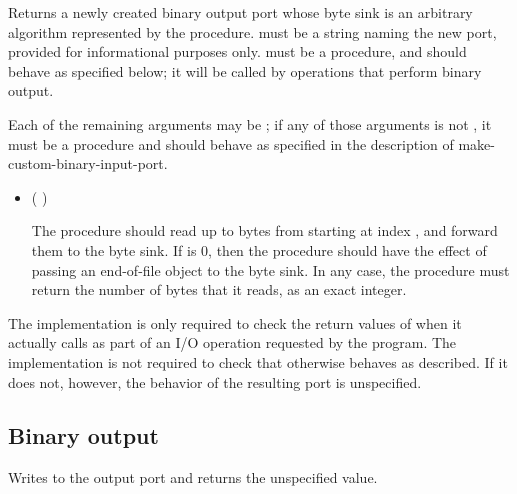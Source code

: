 \begin{entry}{%
}

Returns a newly created binary output port whose byte sink is
an arbitrary algorithm represented by the  procedure.
 must be a string naming the new port,
provided for informational purposes only.
 must be a procedure, and should behave as specified
below; it will be called by operations that perform binary output.

Each of the remaining arguments may be \schfalse{}; if any of
those arguments is not \schfalse{}, it must be a procedure and
should behave as specified in the description of
{\cf make-custom-binary-input-port}.
   
\begin{itemize}
\item {\cf (   )}
       
  The  procedure should read up to  bytes
  from  starting at index , and forward
  them to the byte sink.
  If  is 0, then the  procedure should
  have the effect of passing an end-of-file object to the byte sink.
  In any case, the  procedure must return the number of
  bytes that it reads, as an exact integer.
\end{itemize}

\implresp The implementation is only required to check the return
values of  when it actually calls  as part of
an I/O operation requested by the program.  The implementation is not
required to check that  otherwise behaves as described.
If it does not, however, the behavior of the resulting port is
unspecified.
\end{entry}

\subsection{Binary output}

\begin{entry}{%
}

Writes  to the output port and returns the unspecified value.
\end{entry}

